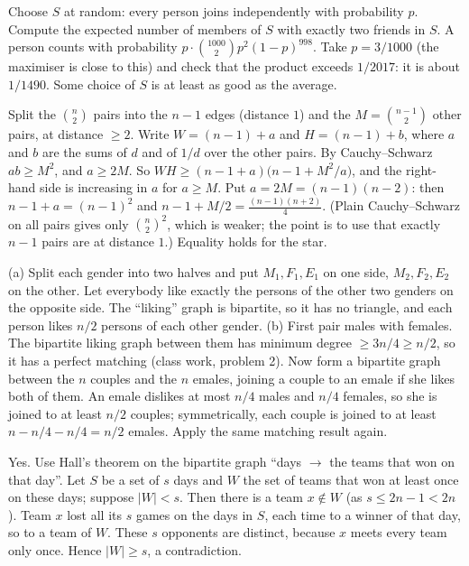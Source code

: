 \documentclass[11pt,a4paper]{article}
\begin{document}

Choose \(S\) at random: every person joins independently with probability \(p\). Compute the expected number of members of \(S\) with exactly two friends in \(S\).
A person counts with probability \(p\cdot\binom{1000}{2}p^2(1-p)^{998}\). Take \(p=3/1000\) (the maximiser is close to this) and check that the product exceeds \(1/2017\): it is about \(1/1490\). Some choice of \(S\) is at least as good as the average.

Split the \(\binom n2\) pairs into the \(n-1\) edges (distance \(1\)) and the \(M=\binom{n-1}2\) other pairs, at distance \(\ge2\). Write \(W=(n-1)+a\) and \(H=(n-1)+b\), where \(a\) and \(b\) are the sums of \(d\) and of \(1/d\) over the other pairs.
By Cauchy--Schwarz \(ab\ge M^2\), and \(a\ge2M\). So \(WH\ge(n-1+a)\bigl(n-1+M^2/a\bigr)\), and the right-hand side is increasing in \(a\) for \(a\ge M\).
Put \(a=2M=(n-1)(n-2)\): then \(n-1+a=(n-1)^2\) and \(n-1+M/2=\frac{(n-1)(n+2)}4\). (Plain Cauchy--Schwarz on all pairs gives only \(\binom n2^2\), which is weaker; the point is to use that exactly \(n-1\) pairs are at distance \(1\).) Equality holds for the star.

(a) Split each gender into two halves and put \(M_1,F_1,E_1\) on one side, \(M_2,F_2,E_2\) on the other. Let everybody like exactly the persons of the other two genders on the opposite side. The ``liking'' graph is bipartite, so it has no triangle, and each person likes \(n/2\) persons of each other gender.
(b) First pair males with females. The bipartite liking graph between them has minimum degree \(\ge3n/4\ge n/2\), so it has a perfect matching (class work, problem 2).
Now form a bipartite graph between the \(n\) couples and the \(n\) emales, joining a couple to an emale if she likes both of them. An emale dislikes at most \(n/4\) males and \(n/4\) females, so she is joined to at least \(n/2\) couples; symmetrically, each couple is joined to at least \(n-n/4-n/4=n/2\) emales. Apply the same matching result again.

Yes. Use Hall's theorem on the bipartite graph ``days \(\to\) the teams that won on that day''.
Let \(S\) be a set of \(s\) days and \(W\) the set of teams that won at least once on these days; suppose \(|W|\lt s\). Then there is a team \(x\notin W\) (as \(s\le2n-1\lt2n\)).
Team \(x\) lost all its \(s\) games on the days in \(S\), each time to a winner of that day, so to a team of \(W\). These \(s\) opponents are distinct, because \(x\) meets every team only once. Hence \(|W|\ge s\), a contradiction.
\end{document}
